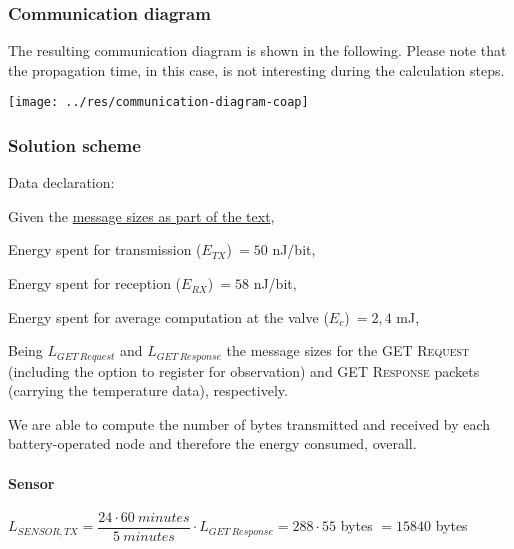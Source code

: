 \documentclass[a4paper,11pt]{article} %
\begin{document}
    \subsubsection{Communication diagram}

    The resulting communication diagram is shown in the following.
    Please note that the propagation time, in this case, is not interesting during the calculation steps.

    \begin{center}
        \texttt{[image: ../res/communication-diagram-coap]}
    \end{center}

    \subsubsection{Solution scheme}

    Data declaration:

    \medskip

    Given the \hyperref[message-sizes-table]{message sizes as part of the text},

    \smallskip

    Energy spent for transmission ($E_{TX}$)$\ = 50$ nJ/bit,

    \smallskip

    Energy spent for reception ($E_{RX}$)$\ = 58$ nJ/bit,

    \smallskip

    Energy spent for average computation at the valve ($E_c$)$\ = 2,4$ mJ,

    \smallskip

    Being $L_{GET\ Request}$ and $L_{GET\ Response}$ the message sizes for the \textsc{GET Request} (including the option to register for observation) and \textsc{GET Response} packets (carrying the temperature data), respectively.

    \bigskip

    We are able to compute the number of bytes transmitted and received by each battery-operated node and therefore the energy consumed, overall.

    \paragraph{Sensor}

    $L_{SENSOR, TX} = \dfrac{24 \cdot 60\ minutes}{5\ minutes} \cdot L_{GET\ Response} = 288 \cdot 55$ bytes $ = 15840$ bytes
\end{document}
